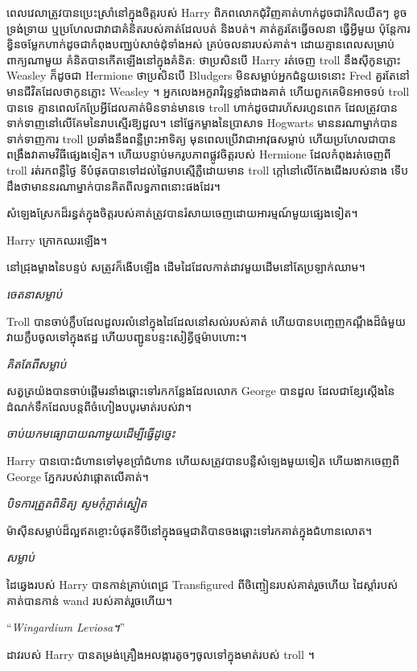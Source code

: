 ពេលវេលាត្រូវបានប្រេះស្រាំនៅក្នុងចិត្តរបស់ Harry ពិភពលោកជុំវិញគាត់ហាក់ដូចជារំកិលយឺតៗ ខូចទ្រង់ទ្រាយ ឬប្រហែលជាវាជាគំនិតរបស់គាត់ដែលបត់ និងបត់។ គាត់​គួរ​តែ​ធ្វើ​ចលនា ធ្វើ​អ្វី​មួយ ប៉ុន្តែ​ការ​ខ្វិន​ចម្លែក​ហាក់​ដូច​ជា​កំពុង​បញ្ឈប់​សាច់ដុំ​ទាំង​អស់ គ្រប់​ចលនា​របស់​គាត់។ ដោយគ្មានពេលសម្រាប់ពាក្យណាមួយ គំនិតបានកើតឡើងនៅក្នុងគំនិត: ថាប្រសិនបើ Harry រត់ចេញ troll នឹងស៊ីកូនភ្លោះ Weasley ក៏ដូចជា Hermione ថាប្រសិនបើ Bludgers មិនសម្លាប់អ្នកជំនួយទេនោះ Fred គួរតែនៅមានជីវិតដែលថាកូនភ្លោះ Weasley ។ អ្នកលេងអក្ខរាវិរុទ្ធខ្លាំងជាងគាត់ ហើយពួកគេមិនអាចទប់ troll បានទេ គ្មានពេលកែប្រែអ្វីដែលគាត់មិនទាន់មានទេ troll ហាក់ដូចជារហ័សរហួនពេក ដែលត្រូវបានទាក់ទាញនៅលើគែមនៃរាបស្មើរឱ្យដួល។ នៅផ្នែកម្ខាងនៃប្រាសាទ Hogwarts មាននរណាម្នាក់បានទាក់ទាញការ troll ប្រឆាំងនឹងពន្លឺព្រះអាទិត្យ មុនពេលប្រើវាជាអាវុធសម្លាប់ ហើយប្រហែលជាបានពង្រឹងវាតាមវិធីផ្សេងទៀត។ ហើយបន្ទាប់មករូបភាពផ្លូវចិត្តរបស់ Hermione ដែលកំពុងរត់ចេញពី troll រត់រកពន្លឺថ្ងៃ ទីបំផុតបានទៅដល់ផ្ទៃរាបស្មើភ្លឺដោយមាន troll ក្តៅនៅលើកែងជើងរបស់នាង ទើបដឹងថាមាននរណាម្នាក់បានគិតពីលទ្ធភាពនោះផងដែរ។

សំឡេង​ស្រែក​ដ៏​រន្ធត់​ក្នុង​ចិត្ត​របស់​គាត់​ត្រូវ​បាន​រំសាយ​ចេញ​ដោយ​អារម្មណ៍​មួយ​ផ្សេង​ទៀត។

Harry ក្រោកឈរឡើង។

នៅជ្រុងម្ខាងនៃបន្ទប់ សត្រូវក៏ងើបឡើង ដើមដៃដែលកាត់ដាវមួយដើមនៅតែប្រឡាក់ឈាម។

\emph{ចេតនាសម្លាប់}

Troll បានចាប់ក្លឹបដែលដួលរលំនៅក្នុងដៃដែលនៅសល់របស់គាត់ ហើយបានបញ្ចេញកណ្តឹងដ៏ធំមួយ វាយក្លឹបចូលទៅក្នុងឥដ្ឋ ហើយបញ្ជូនបន្ទះសៀគ្វីថ្មម៉ាបហោះ។

\emph{គិតតែពីសម្លាប់}

សត្វត្រយ៉ងបានចាប់ផ្តើមរនាំងឆ្ពោះទៅរកកន្លែងដែលលោក George បានដួល ដែលជាខ្សែស្តើងនៃដំណក់ទឹកដែលបន្តពីចំហៀងបបូរមាត់របស់វា។

\emph{ចាប់យកមធ្យោបាយណាមួយដើម្បីធ្វើដូច្នេះ}

Harry បានបោះជំហានទៅមុខប្រាំជំហាន ហើយសត្រូវបានបន្លឺសំឡេងមួយទៀត ហើយងាកចេញពី George ភ្នែករបស់វាផ្តោតលើគាត់។

\emph{បិទការត្រួតពិនិត្យ សូមកុំភ្លាត់ស្នៀត}

ម៉ាស៊ីនសម្លាប់ដ៏ល្អឥតខ្ចោះបំផុតទីបីនៅក្នុងធម្មជាតិបានចងឆ្ពោះទៅរកគាត់ក្នុងជំហានលោត។

\emph{សម្លាប់}

ដៃឆ្វេងរបស់ Harry បានកាន់គ្រាប់ពេជ្រ Transfigured ពីចិញ្ចៀនរបស់គាត់រួចហើយ ដៃស្តាំរបស់គាត់បានកាន់ wand របស់គាត់រួចហើយ។

“\emph{Wingardium Leviosa។}”

ដាវរបស់ Harry បានតម្រង់គ្រឿងអលង្ការតូចៗចូលទៅក្នុងមាត់របស់ troll ។

